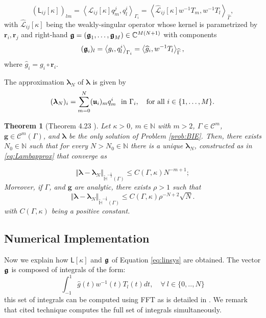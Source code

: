\documentclass[10pt,reqno]{amsart}
\newcommand{\IH}{\mathbb{H}}
\newtheorem{theorem}{Theorem}[section]
\theoremstyle{remark}
\newcommand{\norm}[1]{\left\Vert #1 \right\Vert}
\newcommand{\dual}[2]{\left\langle #1 ,#2 \right\rangle}
\newcommand{\vr}{\mathbf{r}}
\newcommand{\vg}{\mathbf{g}}
\newcommand{\kk}{\kappa}
\newcommand{\half}{\frac{1}{2}}
\newcommand{\opL}{\mathcal{L}}
\newcommand{\matL}{\mathsf{L}}
\newcommand{\bmatL}{\boldsymbol{\matL}}
\newcommand{\wGamma}{\widehat{\Gamma}}
\newcommand{\vlambda}{\boldsymbol{\lambda}}
\newcommand{\vfu}{\boldsymbol{\frak{u}}}
\newcommand{\vfg}{\boldsymbol{\frak{g}}}
\numberwithin{equation}{section}
\begin{document}
\begin{equation}\label{eq:matLij}
(\matL_{ij}[\kappa])_{lm} = \dual{\opL_{ij}[\kappa] q_m^j}{q_l^i}_{\Gamma_i} 
=  \dual{\widehat{\opL}_{ij}[\kappa] w^{-1}T_m}{w^{-1}T_l}_{\wGamma},
\end{equation}
 with $\widehat{\opL}_{ij}[\kappa]$ being the weakly-singular operator whose kernel is parametrized by $\vr_i, \vr_j$ and right-hand $\vfg=(\vfg_1,\ldots,\vfg_M) \in \mathbb{C}^{M(N+1)}$ with components $$(\vfg_i)_l = \dual{g_i}{q_l^i}_{\Gamma_i}= \dual{\widehat{g}_i}{w^{-1}T_l}_{\wGamma},$$ where $\widehat{g}_i = g_i \circ \vr_i$. 
 
The approximation $\vlambda_N$ of $\vlambda$  is given by 
\begin{equation}
\label{eq:Lambapprox}
(\vlambda_N)_i = \sum_{m=0}^N (\vfu_i)_m q^i_m \ \mbox{ in } \Gamma_i , \quad\mbox{for all} \ i \in \{ 1, \ldots ,M\}.
\end{equation} 

\begin{theorem}[Theorem 4.23 \cite{PaperB}]
\label{teo:discerror}
Let $\kk > 0$, $m \in \mathbb{N}$ with $m>2$, $\Gamma \in \mathcal{C}^m$, $\vg \in \mathcal{C}^m(\Gamma)$, and $\vlambda$ be the only solution of Problem \ref{prob:BIE}. Then, there exists $N_0 \in \mathbb{N}$ such that for every $N> N_0 \in \mathbb{N}$ there is a unique $\vlambda_N$, constructed as in \eqref{eq:Lambapprox} that converge as

$$\norm{\vlambda - \vlambda_N }_{\widetilde{\IH}^{-\half}(\Gamma)} \leq C(\Gamma,\kappa) N^{-m+1};$$
 Moreover, if $\Gamma$, and $\vg$ are analytic, there exists $\rho >1$ such that 
$$\norm{\vlambda - \vlambda_N }_{\widetilde{\IH}^{-\half}(\Gamma)} \leq C(\Gamma,\kappa) \rho^{-N+2}\sqrt{N}.$$
with $C(\Gamma,\kappa)$ being a positive constant.
\end{theorem} 

\subsection{Numerical Implementation}
\label{sec:NumImplemntation}

Now we explain how $\bmatL[\kappa] $ and $\vfg$ of Equation \eqref{eq:linsys} are obtained. The vector $\vfg$  is composed of integrals of the form:
$$\int_{-1}^{1} \widehat{g}(t) w^{-1}(t) T_l(t) dt, \quad \forall \ l \in \{0,..,N\}$$ 
this set of integrals can be computed using FFT as is detailed in \cite{trefethen2013approximation}. We remark that cited technique computes the full set of integrals simultaneously. 
\end{document}
